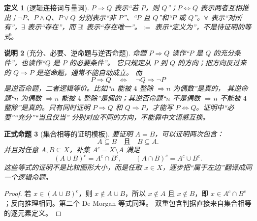 \documentclass[UTF8,fontset=none,a4paper,11pt]{ctexart}
\theoremstyle{foundation-definition}
\newtheorem{definition}{定义}[section]
\theoremstyle{foundation-theorem}
\theoremstyle{foundation-proposition}
\newtheorem{proposition}[definition]{正式命题}
\theoremstyle{foundation-example}
\theoremstyle{foundation-remark}
\newtheorem{remark}[definition]{说明}
\theoremstyle{foundation-theorem}
\begin{document}
\begin{definition}[逻辑连接词与量词]\label{def:logic-symbols}
\(P\Rightarrow Q\) 表示“若 \(P\)，则 \(Q\)”；\(P\Leftrightarrow Q\) 表示两者互相推出；\(\neg P\)、\(P\land Q\)、\(P\lor Q\) 分别表示“非 \(P\)”、“\(P\) 且 \(Q\)”和“\(P\) 或 \(Q\)”。\(\forall\) 表示“对所有”，\(\exists\) 表示“存在”，而 \(\exists!\) 表示“存在唯一”。\(:=\) 表示“定义为”，不是待证明的等式。
\end{definition}

\begin{remark}[充分、必要、逆命题与逆否命题]
命题 \(P\Rightarrow Q\) 读作“\(P\) 是 \(Q\) 的充分条件”，也读作“\(Q\) 是 \(P\) 的必要条件”。
它只规定从 \(P\) 到 \(Q\) 的方向；把方向反过来的 \(Q\Rightarrow P\) 是逆命题，通常不能自动成立。
而
\[
P\Rightarrow Q
\quad\Longleftrightarrow\quad
\neg Q\Rightarrow\neg P
\]
是逆否命题，二者逻辑等价。比如“\(n\) 能被 \(4\) 整除 \(\Rightarrow n\) 为偶数”是真的，
其逆命题“\(n\) 为偶数 \(\Rightarrow n\) 能被 \(4\) 整除”是假的；其逆否命题“\(n\) 不是偶数
\(\Rightarrow n\) 不能被 \(4\) 整除”是真的。只有同时证明 \(P\Rightarrow Q\) 和
\(Q\Rightarrow P\)，才能写 \(P\Leftrightarrow Q\)。证明中“必要”“充分”“当且仅当”
分别对应不同的方向，不能靠中文语感互换。
\end{remark}

\begin{proposition}[集合相等的证明模板]
要证明 \(A=B\)，可以证明两次包含：
\[
A\subseteq B\quad\text{且}\quad B\subseteq A.
\]
并且对任意 \(A,B\subseteq X\)，补集 \(A^c=X\setminus A\) 满足
\[
(A\cup B)^c=A^c\cap B^c,\qquad
(A\cap B)^c=A^c\cup B^c.
\]
这些等式的证明不是比较图形大小，而是任取 \(x\in X\)，逐步把“属于左边”翻译成同一个逻辑命题。
\end{proposition}

\begin{proof}
若 \(x\in(A\cup B)^c\)，则 \(x\notin A\cup B\)，所以 \(x\notin A\) 且
\(x\notin B\)，即 \(x\in A^c\cap B^c\)；反向推理相同。第二个 De Morgan 等式同理。
双重包含判据直接来自集合相等的逐元素定义。
\end{proof}
\end{document}
